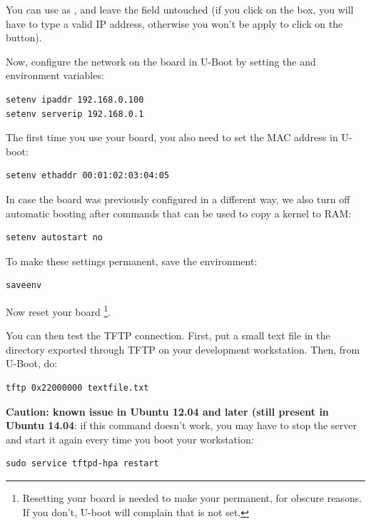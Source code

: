 You can use  as , and leave the
 field untouched (if you click on the  box, you
will have to type a valid IP address, otherwise you won't be apply to
click on the  button).

Now, configure the network on the board in U-Boot by setting the 
and  environment variables:

\begin{verbatim}
setenv ipaddr 192.168.0.100
setenv serverip 192.168.0.1
\end{verbatim}

The first time you use your board, you also need to set the MAC
address in U-boot:

\begin{verbatim}
setenv ethaddr 00:01:02:03:04:05
\end{verbatim}

In case the board was previously configured in a different way, we
also turn off automatic booting after commands that can be used to
copy a kernel to RAM:

\begin{verbatim}
setenv autostart no
\end{verbatim}

To make these settings permanent, save the environment:

\begin{verbatim}
saveenv
\end{verbatim}

Now reset your board \footnote{Resetting your board is needed to
make your  permanent, for obscure reasons. If you
don't, U-boot will complain that  is not
set.}.

You can then test the TFTP connection. First, put a small text file in
the directory exported through TFTP on your development
workstation. Then, from U-Boot, do:

\begin{verbatim}
tftp 0x22000000 textfile.txt
\end{verbatim}

{\bf Caution: known issue in Ubuntu 12.04 and later (still present
in Ubuntu 14.04}: if this command doesn't work, you may have to
stop the server and start it again every time you boot your
workstation:

\begin{verbatim}
sudo service tftpd-hpa restart
\end{verbatim}

